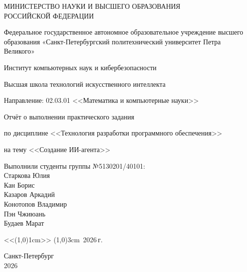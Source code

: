 \thispagestyle{empty} %

\begin{center}
    МИНИСТЕРСТВО НАУКИ И ВЫСШЕГО ОБРАЗОВАНИЯ\\ РОССИЙСКОЙ ФЕДЕРАЦИИ

    Федеральное государственное автономное образовательное учреждение высшего образования «Санкт-Петербургский политехнический университет Петра Великого»

    Институт компьютерных наук и кибербезопасности

    Высшая школа технологий искусственного интеллекта

    Направление: 02.03.01 <<Математика и компьютерные науки>>

    \vspace{4cm}
    {\Large
        Отчёт о выполнении практического задания

        по дисциплине <<Технология разработки программного обеспечения>>

        на тему <<Создание ИИ-агента>>

    }
    \vspace{4cm}

    \begin{flushleft}
        Выполнили студенты группы №5130201/40101:\\[0.5em]
        Старкова Юлия\\
        Кан Борис\\
        Казаров Аркадий\\
        Конотопов Владимир\\
        Пэн Чжиюань\\
        Будаев Марат
    \end{flushleft}

    \vspace{1cm}
    \hfill
    <<\line(1,0){1cm}>> \line(1,0){3cm}\, 2026\,г.

    \vspace{2cm}
    Санкт-Петербург \\
    2026
\end{center}